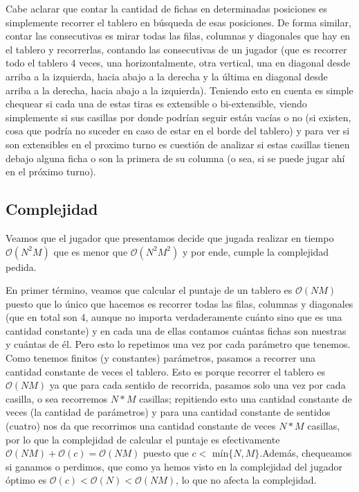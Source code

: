 \documentclass[A4paper,oneside,fleqn,11pt]{article}
\theoremstyle{definition}
\begin{document}
Cabe aclarar que contar la cantidad de fichas en determinadas posiciones es simplemente recorrer el tablero en búsqueda de esas posiciones. De forma similar, contar las consecutivas es mirar todas las filas, columnas y diagonales que hay en el tablero y recorrerlas, contando las consecutivas de un jugador (que es recorrer todo el tablero 4 veces, una horizontalmente, otra vertical, una en diagonal desde arriba a la izquierda, hacia abajo a la derecha y la última en diagonal desde arriba a la derecha, hacia abajo a la izquierda). Teniendo esto en cuenta es simple chequear si cada una de estas tiras es extensible o bi-extensible, viendo simplemente si sus casillas por donde podrían seguir están vacías o no (si existen, cosa que podría no suceder en caso de estar en el borde del tablero) y para ver si son extensibles en el proximo turno es cuestión de analizar si estas casillas tienen debajo alguna ficha o son la primera de su columna (o sea, si se puede jugar ahí en el próximo turno).

\subsection{Complejidad}

Veamos que el jugador que presentamos decide que jugada realizar en tiempo $\mathcal{O}(N^2 M)$ que es menor que $\mathcal{O}(N^2 M^2)$ y por ende, cumple la complejidad pedida. 





En primer término, veamos que calcular el puntaje de un tablero es $\mathcal{O}(NM)$ puesto que lo único que hacemos es recorrer todas las filas, columnas y diagonales (que en total son 4, aunque no importa verdaderamente cuánto sino que es una cantidad constante) y en cada una de ellas contamos cuántas fichas son nuestras y cuántas de él. Pero esto lo repetimos una vez por cada parámetro que tenemos. Como tenemos finitos (y constantes) parámetros, pasamos a recorrer una cantidad constante de veces el tablero. Esto es porque recorrer el tablero es $\mathcal{O}(NM)$ ya que para cada sentido de recorrida, pasamos solo una vez por cada casilla, o sea recorremos $N*M$ casillas; repitiendo esto una cantidad constante de veces (la cantidad de parámetros) y para una cantidad constante de sentidos (cuatro) nos da que recorrimos una cantidad constante de veces $N*M $ casillas, por lo que la complejidad de calcular el puntaje es efectivamente $\mathcal{O}(NM)+\mathcal{O}(c)=\mathcal{O}(NM)$ puesto que $c<$ mín$\{N,M\}$.Además, chequeamos si ganamos o perdimos, que como ya hemos visto en la complejidad del jugador óptimo es $\mathcal{O}(c)<\mathcal{O}(N)<\mathcal{O}(NM)$, lo que no afecta la complejidad.
\end{document}
